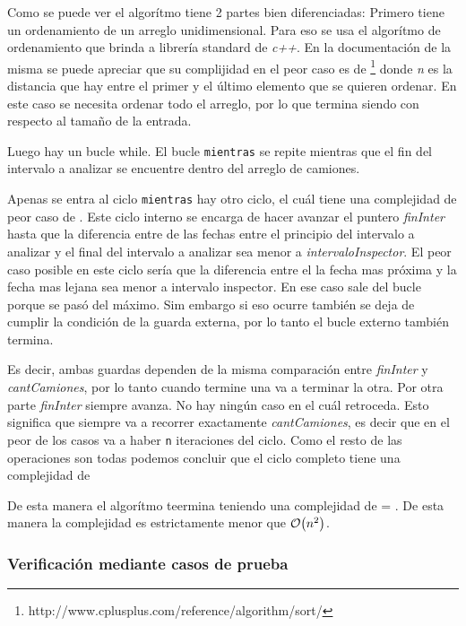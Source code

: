 \documentclass[11pt, a4paper, twoside]{article}
\begin{document}
Como se puede ver el algorítmo tiene 2 partes bien diferenciadas: Primero 
tiene un ordenamiento de un arreglo unidimensional. Para eso se usa el algorítmo de ordenamiento
que brinda a librería standard de \textit{c++}. En la documentación de la misma se puede apreciar
que su complijidad en el peor caso es de \footnote{http://www.cplusplus.com/reference/algorithm/sort/}
donde \textit{n} es la distancia que hay entre el primer y el último elemento que se quieren ordenar.
En este caso se necesita ordenar todo el arreglo, por lo que termina siendo  con respecto
al tamaño de la entrada.

Luego hay un bucle while. El bucle \texttt{mientras} se repite mientras que el fin del intervalo a analizar
se encuentre dentro del arreglo de camiones.

Apenas se entra al ciclo \texttt{mientras} hay otro ciclo, el cuál tiene una complejidad de peor caso de .
Este ciclo interno se encarga de hacer avanzar el puntero \textit{finInter} hasta que la diferencia entre
de las fechas entre el principio del intervalo a analizar y el final del intervalo a analizar sea menor a
\textit{intervaloInspector}. El peor caso posible en este ciclo sería que la diferencia entre el la fecha mas próxima
y la fecha mas lejana sea menor a intervalo inspector. En ese caso sale del bucle porque se pasó del máximo. Sim embargo
si eso ocurre también se deja de cumplir la condición de la guarda externa, por lo tanto el bucle externo también termina.

Es decir, ambas guardas dependen de la misma comparación entre \textit{finInter} y \textit{cantCamiones}, por lo tanto cuando
termine una va a terminar la otra. Por otra parte \textit{finInter} siempre avanza. No hay ningún caso en el cuál retroceda.
Esto significa que siempre va a recorrer exactamente \textit{cantCamiones}, es decir que en el peor de los casos va a haber
\texttt{n} iteraciones del ciclo. Como el resto de las operaciones son todas  podemos concluir que el ciclo completo
tiene una complejidad de 

De esta manera el algorítmo teermina teniendo una complejidad de  = . De esta manera
la complejidad es estrictamente menor que $\mathop{}\mathopen{}\mathcal{O}\mathopen{}\left(n^{2}\right)$.









\subsubsection{Verificación mediante casos de prueba}
\end{document}
